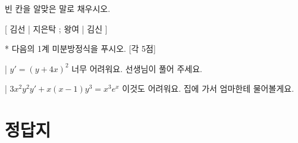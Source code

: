 \documentclass[a4paper]{oblivoir}
\begin{document}
\begin{QAwrite}

\begin{premise}
빈 칸을 알맞은 말로 채우시오.
\end{premise}



\end{QAwrite}


\begin{QAwrite}

[ 
김선 | 
지은탁 ; 
왕여 | 
김신 
]{
}

\end{QAwrite}

\begin{QAwrite}
\begin{premise}*
다음의 1계 미분방정식을 푸시오. [각 5점]
\end{premise}

\qa*|{
$y' = (y + 4x)^2$
}{
너무 어려워요.
선생님이 풀어 주세요.
}

\qa*|{
$3x^2y^2y' + x(x - 1)y^3 = x^3e^x$
}{
이것도 어려워요.
집에 가서 엄마한테 물어볼게요.
}
\end{QAwrite}

\section{정답지}
\InputAnswersSheet
\end{document}
